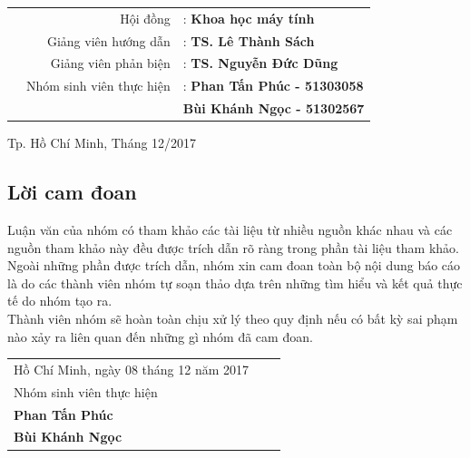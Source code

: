 \documentclass[a4paper,12pt]{article}
\begin{document}
\begin{titlepage}
		\begin{table}[h]
			\begin{tabular}{rrl}
				\vspace{0.5cm}
				\hspace{1.5 cm} & Hội đồng & : \bf{Khoa học máy tính}\\
				\vspace{0.5cm}
				\hspace{1.5 cm} & Giảng viên hướng dẫn & : \bf{TS. Lê Thành Sách}\\
				\vspace{0.5cm}
				\hspace{1.5cm} & Giảng viên phản biện & : \bf{TS. Nguyễn Đức Dũng}\\
				\vspace{0.5cm}
				\hspace{1.5 cm} & Nhóm sinh viên thực hiện & : \bf{Phan Tấn Phúc - 51303058}\\
				\hspace{1.5 cm} & \hspace{5 cm} &  \hspace{0.15cm} \bf{Bùi Khánh Ngọc - 51302567}\\
				
			\end{tabular}
		\end{table}
		\vspace{2cm}
		\begin{center}
			{\footnotesize Tp. Hồ Chí Minh, Tháng 12/2017}
		\end{center}
	\end{titlepage}
	\newpage
	\subsection*{Lời cam đoan}
	Luận văn của nhóm có tham khảo các tài liệu từ nhiều nguồn khác nhau và các nguồn tham khảo này đều được trích dẫn rõ ràng trong phần tài liệu tham khảo. Ngoài những phần được trích dẫn, nhóm xin cam đoan toàn bộ nội dung báo cáo là do các thành viên nhóm tự soạn thảo dựa trên những tìm hiểu và kết quả thực tế do nhóm tạo ra. \\
	Thành viên nhóm sẽ hoàn toàn chịu xử lý theo quy định nếu có bất kỳ sai phạm nào xảy ra liên quan đến những gì nhóm đã cam đoan.
	\begin{table}[h]
		\begin{tabular}{lll}
			\hspace{8cm} Hồ Chí Minh, ngày 08 tháng 12 năm 2017\\
			\hspace{10cm}Nhóm sinh viên thực hiện\\
			\hspace{10.5cm}\textbf{Phan Tấn Phúc}\\
			\hspace{10.5cm}\textbf{Bùi Khánh Ngọc}
		\end{tabular}
	\end{table}
	
\end{document}
